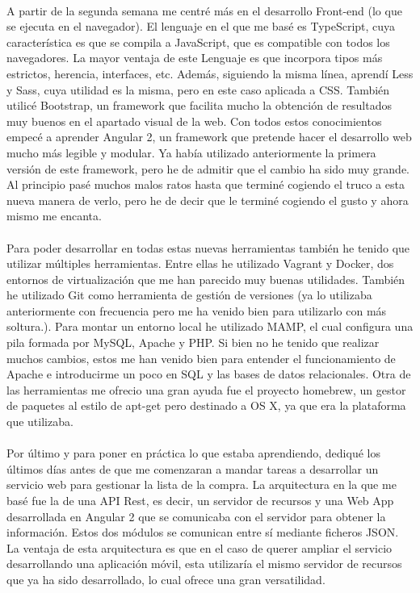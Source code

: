 \documentclass[10pt, a4paper,spanish]{article}
\begin{document}
                \paragraph{}
                A partir de la segunda semana me centré más en el desarrollo Front-end (lo que se ejecuta en el navegador). El lenguaje en el que me basé es TypeScript, cuya característica es que se compila a JavaScript, que es compatible con todos los navegadores. La mayor ventaja de este Lenguaje es que incorpora tipos más estrictos, herencia, interfaces, etc. Además, siguiendo la misma línea, aprendí Less y Sass, cuya utilidad es la misma, pero en este caso aplicada a CSS. También utilicé Bootstrap, un framework que facilita mucho la obtención de resultados muy buenos en el apartado visual de la web. Con todos estos conocimientos empecé a aprender Angular 2, un framework que pretende hacer el desarrollo web mucho más legible y modular. Ya había utilizado anteriormente la primera versión de este framework, pero he de admitir que el cambio ha sido muy grande. Al principio pasé muchos malos ratos hasta que terminé cogiendo el truco a esta nueva manera de verlo, pero he de decir que le terminé cogiendo el gusto y ahora mismo me encanta.

                \paragraph{}
                Para poder desarrollar en todas estas nuevas herramientas también he tenido que utilizar múltiples herramientas. Entre ellas he utilizado Vagrant y Docker, dos entornos de virtualización que me han parecido muy buenas utilidades. También he utilizado Git como herramienta de gestión de versiones (ya lo utilizaba anteriormente con frecuencia pero me ha venido bien para utilizarlo con más soltura.). Para montar un entorno local he utilizado MAMP, el cual configura una pila formada por MySQL, Apache y PHP. Si bien no he tenido que realizar muchos cambios, estos me han venido bien para entender el funcionamiento de Apache e introducirme un poco en SQL y las bases de datos relacionales. Otra de las herramientas me ofrecio una gran ayuda fue el proyecto homebrew, un gestor de paquetes al estilo de apt-get pero destinado a OS X, ya que era la plataforma que utilizaba.

                \paragraph{}
                Por último y para poner en práctica lo que estaba aprendiendo, dediqué los últimos días antes de que me comenzaran a mandar tareas a desarrollar un servicio web para gestionar la lista de la compra. La arquitectura en la que me basé fue la de una API Rest, es decir, un servidor de recursos y una Web App desarrollada en Angular 2 que se comunicaba con el servidor para obtener la información. Estos dos módulos se comunican entre sí mediante ficheros JSON. La ventaja de esta arquitectura es que en el caso de querer ampliar el servicio desarrollando una aplicación móvil, esta utilizaría el mismo servidor de recursos que ya ha sido desarrollado, lo cual ofrece una gran versatilidad.
\end{document}
